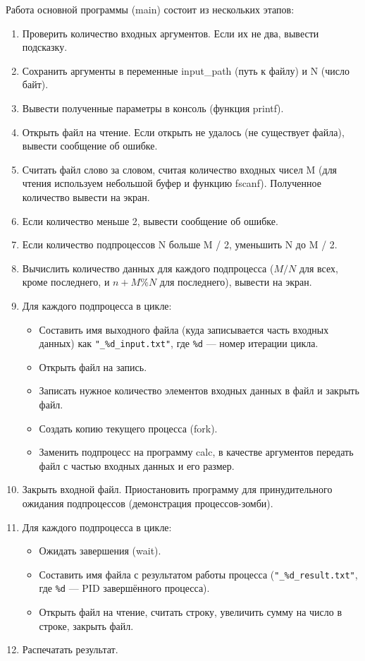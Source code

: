 Работа основной программы (main) состоит из нескольких этапов:
\begin{enumerate}
    \item Проверить количество входных аргументов. Если их не два, вывести подсказку.
    \item Сохранить аргументы в переменные input\_path (путь к файлу) и N (число байт).
    \item Вывести полученные параметры в консоль (функция printf).
    \item Открыть файл на чтение. Если открыть не удалось (не существует файла), вывести сообщение об ошибке.
    \item Считать файл слово за словом, считая количество входных чисел M (для чтения используем небольшой буфер и функцию fscanf). Полученное количество вывести на экран.
    \item Если количество меньше 2, вывести сообщение об ошибке.
    \item Если количество подпроцессов N больше M / 2, уменьшить N до M / 2.
    \item Вычислить количество данных для каждого подпроцесса ($M / N$ для всех, кроме последнего, и $n + M \% N$ для последнего), вывести на экран.
    \item Для каждого подпроцесса в цикле:
    \begin{itemize}
        \item Составить имя выходного файла (куда записывается часть входных данных) как \texttt{"\_\%d\_input.txt"}, где \texttt{\%d} — номер итерации цикла.
        \item Открыть файл на запись.
        \item Записать нужное количество элементов входных данных в файл и закрыть файл.
        \item Создать копию текущего процесса (fork).
        \item Заменить подпроцесс на программу calc, в качестве аргументов передать файл с частью входных данных и его размер.
    \end{itemize}
    \item Закрыть входной файл. Приостановить программу для принудительного ожидания подпроцессов (демонстрация процессов-зомби).
    \item Для каждого подпроцесса в цикле:
    \begin{itemize}
        \item Ожидать завершения (wait).
        \item Составить имя файла с результатом работы процесса (\texttt{"\_\%d\_result.txt"}, где \texttt{\%d} — PID завершённого процесса).
        \item Открыть файл на чтение, считать строку, увеличить сумму на число в строке, закрыть файл.
    \end{itemize}
    \item Распечатать результат.
\end{enumerate}


